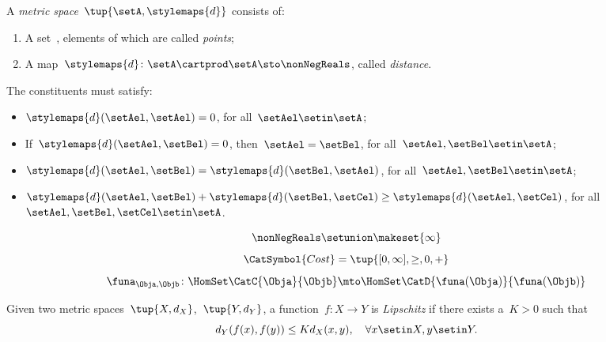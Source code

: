 {\begin{forslides}
        \begin{definition}
            \label{def:metric_space}
            A \emph{metric space}~$\tup{\setA,\stylemaps{d}}$ consists of:
            \begin{enumerate}
                \item A set~\setA, elements of which are called \emph{points};
                \item A map~$\stylemaps{d}\colon \setA\cartprod \setA \sto \nonNegReals$, called \emph{distance}.
            \end{enumerate}
            The constituents must satisfy:
            \begin{itemize}
                \item $\stylemaps{d}(\setAel,\setAel)=0$, for all~$\setAel\setin \setA$;
                \item If~$\stylemaps{d}(\setAel, \setBel)=0$, then~$\setAel=\setBel$, for all~$\setAel,\setBel\setin \setA$;
                \item $\stylemaps{d}(\setAel, \setBel)=\stylemaps{d}(\setBel, \setAel)$, for all~$\setAel,\setBel\setin \setA$;
                \item $\stylemaps{d}(\setAel, \setBel)+\stylemaps{d}(\setBel, \setCel)\geq \stylemaps{d}(\setAel, \setCel)$, for all~$\setAel,\setBel,\setCel\setin \setA$.
            \end{itemize}
        \end{definition}
        \begin{equation}
            \label{eq:r_with_inft}
            \nonNegReals \setunion \makeset{\infty}
        \end{equation}
        \begin{equation}
            \label{eq:cost_cat}
            \CatSymbol{Cost}=\tup{[0,\infty], \geq, 0, +}
        \end{equation}
        \begin{equation}
            \label{eq:enriched_fun_a}
            \funa_{\Obja, \Objb} \colon \HomSet\CatC{\Obja}{\Objb} \mto \HomSet\CatD{\funa(\Obja)}{\funa(\Objb)}
        \end{equation}

        \begin{definition}
            \label{def:cost_enrich_a}
            Given two metric spaces~$\tup{X,d_X}$,~$\tup{Y,d_Y}$, a function~$f\colon X\to Y$ is \emph{Lipschitz} if there exists a~$K>0$ such that
            \begin{equation}
                d_Y(f(x),f(y))\leq Kd_X(x,y),\quad \forall x\setin X,y\setin Y.
            \end{equation}
        \end{definition}


\end{forslides}}
